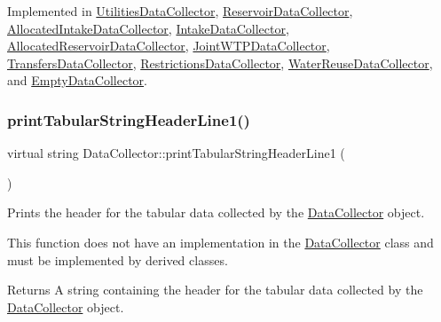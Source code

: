Implemented in \mbox{\hyperlink{classUtilitiesDataCollector_a39e7d28a70a0f71b3f1cc28b19c7e2d9}{Utilities\+Data\+Collector}}, \mbox{\hyperlink{classReservoirDataCollector_a81777b029bf26be403b9f4d67f01588b}{Reservoir\+Data\+Collector}}, \mbox{\hyperlink{classAllocatedIntakeDataCollector_a8568c28b643b9a9199e2b91ae5ebbe83}{Allocated\+Intake\+Data\+Collector}}, \mbox{\hyperlink{classIntakeDataCollector_ada2b88b7a05455cf6f2eebf82d37b3c5}{Intake\+Data\+Collector}}, \mbox{\hyperlink{classAllocatedReservoirDataCollector_ae5a9aa9b2a3cffd8f5ffe983c8fcf6c8}{Allocated\+Reservoir\+Data\+Collector}}, \mbox{\hyperlink{classJointWTPDataCollector_a9159c0e5c58ceb8b9bf86f01b53ecdef}{Joint\+W\+T\+P\+Data\+Collector}}, \mbox{\hyperlink{classTransfersDataCollector_a292b907e5c1000d8b3d868409637b9a6}{Transfers\+Data\+Collector}}, \mbox{\hyperlink{classRestrictionsDataCollector_a45e5612e70ec98430e31271f68ca407e}{Restrictions\+Data\+Collector}}, \mbox{\hyperlink{classWaterReuseDataCollector_af8b637ad080f354dc145f11580834da8}{Water\+Reuse\+Data\+Collector}}, and \mbox{\hyperlink{classEmptyDataCollector_a2bb44e454376ed518c4d89cf324b8bd7}{Empty\+Data\+Collector}}.

\mbox{\label{classDataCollector_a91619cfa9e9b8cefd2f7c20d5718b41e}} 
\subsubsection{\texorpdfstring{print\+Tabular\+String\+Header\+Line1()}{printTabularStringHeaderLine1()}}
{\footnotesize\ttfamily virtual string Data\+Collector\+::print\+Tabular\+String\+Header\+Line1 (\begin{DoxyParamCaption}{ }\end{DoxyParamCaption})\hspace{0.3cm}{\ttfamily [pure virtual]}}



Prints the header for the tabular data collected by the \mbox{\hyperlink{classDataCollector}{Data\+Collector}} object. 

This function does not have an implementation in the \mbox{\hyperlink{classDataCollector}{Data\+Collector}} class and must be implemented by derived classes.

\begin{DoxyReturn}{Returns}
A string containing the header for the tabular data collected by the \mbox{\hyperlink{classDataCollector}{Data\+Collector}} object. 
\end{DoxyReturn}


